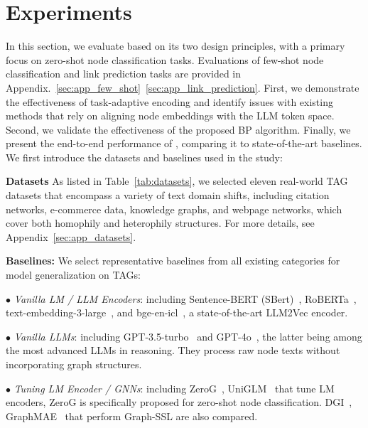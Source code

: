 \section{Experiments} 
In this section, we evaluate \proj based on its two design principles, with a primary focus on zero-shot node classification tasks. Evaluations of few-shot node classification and link prediction tasks are provided in Appendix.~\ref{sec:app_few_shot}~\ref{sec:app_link_prediction}. First, we demonstrate the effectiveness of task-adaptive encoding and identify issues with existing methods that rely on aligning node embeddings with the LLM token space. Second, we validate the effectiveness of the proposed BP algorithm. Finally, we present the end-to-end performance of \proj, comparing it to state-of-the-art baselines. We first introduce the datasets and baselines used in the study:

\textbf{Datasets} As listed in Table~\ref{tab:datasets}, we selected eleven real-world TAG datasets that encompass a variety of text domain shifts, including citation networks, e-commerce data, knowledge graphs, and webpage networks, which cover both homophily and heterophily structures. For more details, see Appendix~\ref{sec:app_datasets}. 



\textbf{Baselines:} We select representative baselines from all existing categories for model generalization on TAGs:

$\bullet$ \textit{Vanilla LM / LLM Encoders}: including Sentence-BERT (SBert)~\cite{reimers2019sentence}, RoBERTa~\cite{liu2019roberta}, text-embedding-3-large~\cite{openai2024textembedding}, and bge-en-icl~\cite{li2024making}, a state-of-the-art LLM2Vec encoder.

$\bullet$ \textit{Vanilla LLMs}: including GPT-3.5-turbo~\cite{achiam2023gpt} and GPT-4o~\cite{hurst2024gpt}, the latter being among the most advanced LLMs in reasoning. They process raw node texts without incorporating graph structures.

$\bullet$ \textit{Tuning LM Encoder / GNNs}: including ZeroG~\cite{li2024zerog}, UniGLM~\cite{fang2024uniglm} that tune LM encoders, ZeroG is specifically proposed for zero-shot node classification. DGI~\cite{velivckovic2018deep}, GraphMAE~\cite{hou2022graphmae} that perform Graph-SSL are also compared.

